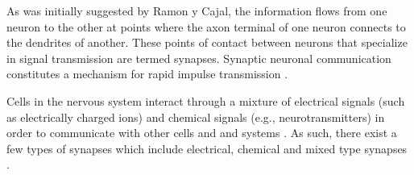 \documentclass[class={myRUCProject}, crop=false]{standalone}
\begin{document}


As was initially suggested by Ramon y Cajal, the information flows from one neuron to the other at points where the axon terminal of one neuron connects to the dendrites of another. These points of contact between neurons that specialize in signal transmission are termed synapses. Synaptic neuronal communication constitutes a mechanism for rapid impulse transmission \cite{Hammond2015ch6}. 

Cells in the nervous system interact through a mixture of electrical signals (such as electrically charged ions) and chemical signals (e.g., neurotransmitters) \cite{lovinger2008communication} in order to communicate with other cells and and systems \cite{SHOYKHET2011783}. As such, there exist a few types of synapses which include electrical, chemical and mixed type synapses \cite{Hammond2015ch6, SZCZUPAK201699}. 

\end{document}
